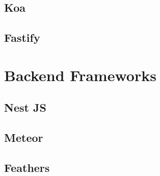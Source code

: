 \subsection{Koa}

\subsection{Fastify}


\section{Backend Frameworks}

\subsection{Nest JS}

\subsection{Meteor}

\subsection{Feathers}

